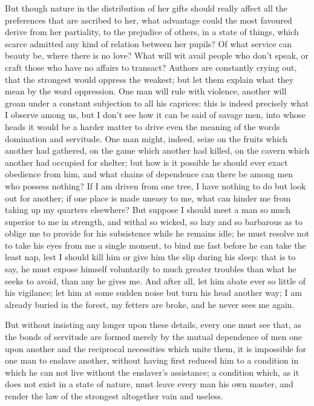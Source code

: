 \documentclass[11pt,twocolumn]{ltugboat}
\begin{document}
But though nature in the distribution of her gifts should really
affect all the preferences that are ascribed to her, what advantage
could the most favoured derive from her partiality, to the prejudice
of others, in a state of things, which scarce admitted any kind of
relation between her pupils? Of what service can beauty be, where
there is no love? What will wit avail people who don't speak, or craft
those who have no affairs to transact? Authors are constantly crying
out, that the strongest would oppress the weakest; but let them
explain what they mean by the word oppression. One man will rule with
violence, another will groan under a constant subjection to all his
caprices: this is indeed precisely what I observe among us, but I
don't see how it can be said of savage men, into whose heads it would
be a harder matter to drive even the meaning of the words domination
and servitude. One man might, indeed, seize on the fruits which
another had gathered, on the game which another had killed, on the
cavern which another had occupied for shelter; but how is it possible
he should ever exact obedience from him, and what chains of dependence
can there be among men who possess nothing? If I am driven from one
tree, I have nothing to do but look out for another; if one place is
made uneasy to me, what can hinder me from taking up my quarters
elsewhere? But suppose I should meet a man so much superior to me in
strength, and withal so wicked, so lazy and so barbarous as to oblige
me to provide for his subsistence while he remains idle; he must
resolve not to take his eyes from me a single moment, to bind me fast
before he can take the least nap, lest I should kill him or give him
the slip during his sleep: that is to say, he must expose himself
voluntarily to much greater troubles than what he seeks to avoid, than
any he gives me. And after all, let him abate ever so little of his
vigilance; let him at some sudden noise but turn his head another way;
I am already buried in the forest, my fetters are broke, and he never
sees me again.

But without insisting any longer upon these details, every one must
see that, as the bonds of servitude are formed merely by the mutual
dependence of men one upon another and the reciprocal necessities
which unite them, it is impossible for one man to enslave another,
without having first reduced him to a condition in which he can not
live without the enslaver's assistance; a condition which, as it does
not exist in a state of nature, must leave every man his own master,
and render the law of the strongest altogether vain and useless.
\end{document}
